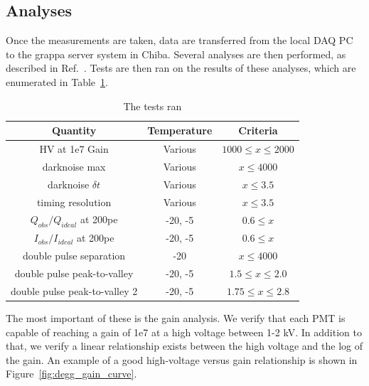 \documentclass[main.tex]{subfiles}
\begin{document}
\subsection{Analyses}

Once the measurements are taken, data are transferred from the local DAQ PC to the grappa server system in Chiba. Several analyses are then performed, as described in Ref.~\cite{degg}. 
Tests are then ran on the results of these analyses, which are enumerated in Table~\ref{table:degg_tests}. 

\begin{table}
    \centering
    \begin{tabular}{c|cc}\rowcolor{blue!25}
        Quantity & Temperature & Criteria\\\hline
        HV at 1e7 Gain & Various & $1000\leq x \leq 2000$ \\
        darknoise max & Various & $x \leq 4000$ \\
        darknoise $\delta t$ & Various & $x \leq 3.5$ \\        
        timing resolution & Various & $x \leq 3.5$ \\
        $Q_{obs}/Q_{ideal}$ at 200pe & -20, -5 & $0.6\leq x$ \\
        $I_{obs}/I_{ideal}$ at 200pe & -20, -5 & $0.6\leq x$ \\
        double pulse separation & -20 & $x \leq 4000$ \\
        double pulse peak-to-valley & -20, -5 & $1.5\leq x\leq 2.0$ \\
        double pulse peak-to-valley 2 & -20, -5 & $1.75\leq x\leq 2.8$ \\
    \end{tabular}
    \caption{The tests ran}\label{table:degg_tests}
\end{table}

The most important of these is the gain analysis. 
We verify that each PMT is capable of reaching a gain of 1e7 at a high voltage between 1-2 kV. 
In addition to that, we verify a linear relationship exists between the high voltage and the log of the gain. 
An example of a good high-voltage versus gain relationship is shown in Figure~\ref{fig:degg_gain_curve}.
\end{document}

